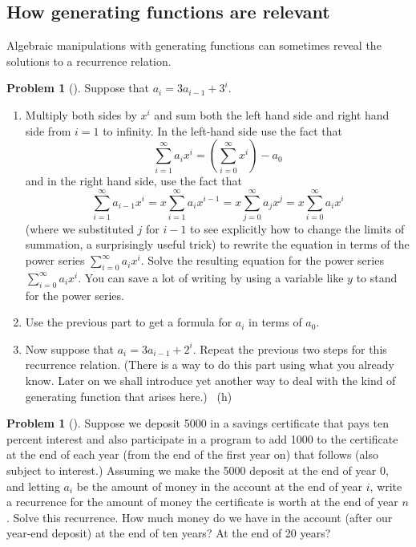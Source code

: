 \documentclass[10pt,]{book}
\theoremstyle{plain}
\theoremstyle{definition}
\newtheorem{activity}[project]{Problem}
\theoremstyle{definition}
\numberwithin{equation}{chapter}
\begin{document}
\subsection[{How generating functions are relevant}]{How generating functions are relevant}\label{subsection-46}
\hypertarget{p-1224}{}%
Algebraic manipulations with generating functions can sometimes reveal the solutions to a recurrence relation.%
\begin{activity}[] \label{substituteandsolve}
\hypertarget{p-1225}{}%
Suppose that \(a_i=3a_{i-1} + 3^i\).%
\begin{enumerate}[font=\bfseries,label=(\alph*),ref=\alph*]
\item\label{task-157} \marginsymbol[-2.5em]{} \hypertarget{p-1226}{}%
Multiply both sides by \(x^i\) and sum both the left hand side and right hand side from \(i=1\) to infinity.  In the left-hand side use the fact that%
\begin{equation*}
\sum_{i=1}^\infty a_ix^i = (\sum_{i=0}^\infty x^i) -a_0
\end{equation*}
and in the right hand side, use the fact that%
\begin{equation*}
\sum_{i=1}^\infty a_{i-1}x^i = x\sum_{i=1}^\infty a_ix^{i-1}
=x\sum_{j=0}^\infty a_jx^j =x\sum_{i=0}^\infty a_ix^i
\end{equation*}
(where we substituted \(j\) for \(i-1\) to see explicitly how to change the limits of summation, a surprisingly useful trick) to rewrite the equation in terms of the power series \(\sum_{i=0}^\infty a_ix^i\).  Solve the resulting equation for the power series \(\sum_{i=0}^\infty a_ix^i\). You can save a lot of writing by using a variable like \(y\) to stand for the power series.%
\item\label{task-158} \marginsymbol[-2.5em]{} \hypertarget{p-1228}{}%
Use the previous part to get a formula for \(a_i\) in terms of \(a_0\).%
\item\label{task-159} \marginsymbol[-2.5em]{} \hypertarget{p-1230}{}%
Now suppose that \(a_i=3a_{i-1} + 2^i\).  Repeat the previous two steps for this recurrence relation.  (There is a way to do this part using what you already know.  Later on we shall introduce yet another way to deal with the kind of generating function that arises here.)%
~{\tiny (h)}\end{enumerate}
\end{activity}
\begin{activity}[] \label{activity-212}
\hypertarget{p-1233}{}%
Suppose we deposit \textdollar{}5000 in a savings certificate that pays ten percent interest and also participate in a program to add \textdollar{}1000 to the certificate at the end of each year (from the end of the first year on) that follows (also subject to interest.) Assuming we make the \textdollar{}5000 deposit at the end of year 0, and letting \(a_i\) be the amount of money in the account at the end of year \(i\), write a recurrence for the amount of money the certificate is worth at the end of year \(n\). Solve this recurrence. How much money do we have in the account (after our year-end deposit) at the end of ten years?  At the end of 20 years?%
\end{activity}
\end{document}
